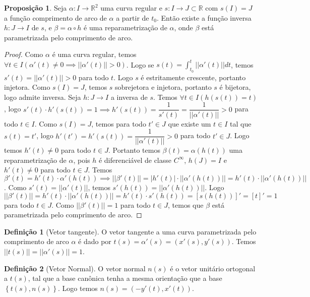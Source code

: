 \documentclass[12pt,leqno,twoside]{amsart}
\theoremstyle{definition}
\newtheorem{proposicao}{Proposição}[section]
\newtheorem{definicao}{Definição}[section]
\begin{document}
\begin{proposicao}
	Seja $\alpha:I\to\mathbb{R}^2$ uma curva regular e $s:I\to J\subset \mathbb{R}$ com $s(I) = J $ a função comprimento de arco de $\alpha$ a partir de $t_0$. Então existe a função inversa $h:J \to I$ de $s$,  e $\beta = \alpha \circ h$ é uma reparametrização de $\alpha$, onde $\beta$ está parametrizada pelo comprimento de arco.
\end{proposicao}
\begin{proof}
	Como $\alpha$ é uma curva regular, temos $\forall t\in I (\alpha'(t) \neq 0 \implies ||\alpha'(t) || > 0 )$. Logo se $s(t) = \displaystyle\int_{t_0}^{t} ||\alpha'(t) || dt$, temos $s'(t) = ||\alpha'(t)|| > 0$ para todo $t$. Logo $s$ é estritamente crescente, portanto injetora.  Como $s(I) = J$, temos $s$ sobrejetora e injetora, portanto $s$ é bijetora, logo admite inversa. Seja $h:J\to I$ a inversa de $s$. Temos $\forall t\in I ( h(s(t)) = t)$, logo $ s'(t)\cdot h'(s(t)) = 1 \implies h'(s(t)) =\dfrac{1}{s'(t)} = \dfrac{1}{||\alpha'(t)||} > 0 $ para todo $t\in I$. Como $s(I) = J$, temos para todo $t'\in J$  que existe um $t\in I$ tal que $s(t) = t'$, logo $ h'( t') = h'(s(t)) = \dfrac{1}{||\alpha'(t)||} > 0$ para todo $t'\in J$. Logo temos $h'(t) \neq 0$ para todo $t\in J$. Portanto temos $\beta(t) = \alpha(h(t))$ uma reparametrização de $\alpha$, pois $h$ é diferenciável de classe $C^{\infty}$, $h(J) = I$ e $h'(t)  \neq 0$ para todo $t\in J$. Temos $\beta'(t) = h'(t)\cdot \alpha'(h(t)) \implies ||\beta'(t) || = |h'(t)| \cdot || \alpha'(h(t))||  = h'(t) \cdot || \alpha'(h(t))|| $. Como $s'(t) = || \alpha'(t)||$, temos $s'(h(t)) = || \alpha'(h(t)) || $. Logo $||\beta'(t)|| = h'(t) \cdot || \alpha'(h(t))|| = h'(t)\cdot s'(h(t)) = \left[ s(h(t))\right]' = \left[ t \right]' = 1$ para todo $t\in J$. Como $||\beta'(t) || = 1$ para todo $t\in J$, temos que $\beta$ está parametrizada pelo comprimento de arco.
\end{proof}

\vspace{0.2cm}

\begin{definicao}[Vetor tangente]
	O vetor tangente a uma curva parametrizada pelo comprimento de arco $\alpha$ é dado por $t(s)  = \alpha'(s)  = (x'(s), y'(s))$. Temos $|| t(s)|| = ||\alpha'(s) || = 1$.
\end{definicao}

\vspace{0.2cm}

\begin{definicao}[Vetor Normal]
	O vetor normal $n(s)$ é o vetor unitário ortogonal a $t(s)$, tal que a base canônica tenha a mesma orientação que a base $\left\{ t(s) , n(s)\right\}$. Logo temos $n(s) = ( -y'(t), x'(t))$.
\end{definicao}
\end{document}
